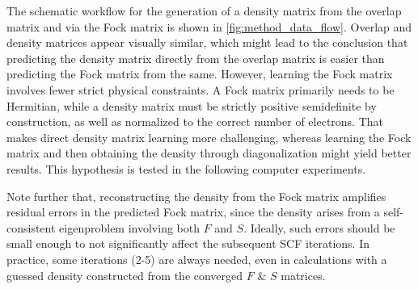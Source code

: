 The schematic workflow for the generation of a density matrix from the overlap matrix and via the Fock matrix is shown in \autoref{fig:method_data_flow}. Overlap and density matrices appear visually similar, which might lead to the conclusion that predicting the density matrix directly from the overlap matrix is easier than predicting the Fock matrix from the same. However, learning the Fock matrix involves fewer strict physical constraints. A Fock matrix primarily needs to be Hermitian, while a density matrix must be strictly positive semidefinite by construction, as well as normalized to the correct number of electrons. That makes direct density matrix learning more challenging, whereas learning the Fock matrix and then obtaining the density through diagonalization might yield better results. This hypothesis is tested in the following computer experiments.

Note further that, reconstructing the density from the Fock matrix amplifies residual errors in the predicted Fock matrix, since the density arises from a self-consistent eigenproblem involving both $F$ and $S$. Ideally, such errors should be small enough to not significantly affect the subsequent SCF iterations. In practice, some iterations (2-5) are always needed, even in calculations with a guessed density constructed from the converged $F$ \& $S$ matrices.\\

